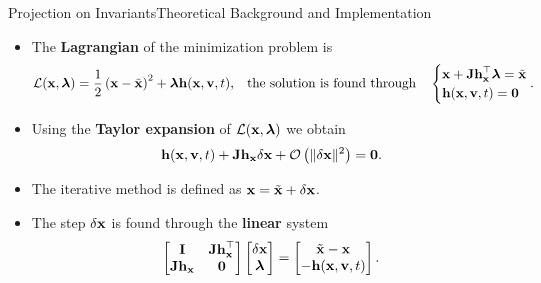 \begin{frame}{Projection on Invariants}{Theoretical Background and Implementation}
  \begin{itemize}
    \item The \textbf{Lagrangian} of the minimization problem is
    \begin{equation*}
      \mathcal{L}(\mathbf{x}, \boldsymbol{\lambda}) = \frac{1}{2}\left(\mathbf{x} - \tilde{\mathbf{x}}\right)^2 + \boldsymbol{\lambda} \mathbf{h}(\mathbf{x}, \mathbf{v}, t) \text{,}
      \quad \text{the solution is found through} \quad
      \begin{cases}
        \mathbf{x} + \mathbf{Jh}_{\mathbf{x}}^\top \boldsymbol{\lambda} = \tilde{\mathbf{x}} \\
        \mathbf{h}(\mathbf{x}, \mathbf{v}, t) = \mathbf{0}
      \end{cases} \hspace{-1.0em}\text{.}
    \end{equation*}
    \item Using the \textbf{Taylor expansion} of $\mathcal{L}(\mathbf{x}, \boldsymbol{\lambda})$ we obtain
    \begin{equation*}
      \mathbf{h}(\mathbf{x}, \mathbf{v}, t) + \mathbf{Jh}_{\mathbf{x}} \delta\mathbf{x} + \mathcal{O}\left(\| \delta\mathbf{x} \|^2\right) = \mathbf{0} \text{.}
    \end{equation*}
    \item The iterative method is defined as $\mathbf{x} = \tilde{\mathbf{x}} + \delta\mathbf{x}$.
    \item The step $\delta\mathbf{x}$ is found through the \textbf{linear} system
    \begin{equation*}
      \begin{bmatrix}
        \mathbf{I}        & \mathbf{Jh}_{\mathbf{x}}^\top \\
        \mathbf{Jh}_{\mathbf{x}} & \mathbf{0}
      \end{bmatrix}
      \begin{bmatrix}
        \delta\mathbf{x} \\
        \boldsymbol{\lambda}
      \end{bmatrix} = \begin{bmatrix}
        \tilde{\mathbf{x}} - \mathbf{x} \\
        -\mathbf{h}(\mathbf{x}, \mathbf{v}, t)
      \end{bmatrix} \text{.}
    \end{equation*}
  \end{itemize}
\end{frame}

